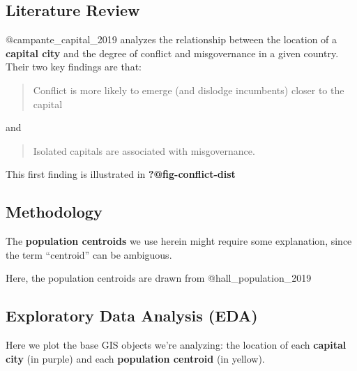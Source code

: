 \documentclass[
  letterpaper,
  DIV=11,
  numbers=noendperiod]{scrartcl}
\begin{document}
\hypertarget{literature-review}{%
\subsection{Literature Review}\label{literature-review}}

@campante\_capital\_2019 analyzes the relationship between the location
of a \textbf{capital city} and the degree of conflict and misgovernance
in a given country. Their two key findings are that:

\begin{quote}
Conflict is more likely to emerge (and dislodge incumbents) closer to
the capital
\end{quote}

and

\begin{quote}
Isolated capitals are associated with misgovernance.
\end{quote}

This first finding is illustrated in \textbf{?@fig-conflict-dist}



\hypertarget{methodology}{%
\subsection{Methodology}\label{methodology}}

The \textbf{population centroids} we use herein might require some
explanation, since the term ``centroid'' can be ambiguous.

Here, the population centroids are drawn from @hall\_population\_2019

\hypertarget{exploratory-data-analysis-eda}{%
\subsection{Exploratory Data Analysis
(EDA)}\label{exploratory-data-analysis-eda}}

Here we plot the base GIS objects we're analyzing: the location of each
\textbf{capital city} (in purple) and each \textbf{population centroid}
(in yellow).
\end{document}
